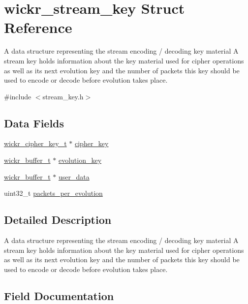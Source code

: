 \hypertarget{structwickr__stream__key}{}\section{wickr\+\_\+stream\+\_\+key Struct Reference}
\label{structwickr__stream__key}


A data structure representing the stream encoding / decoding key material A stream key holds information about the key material used for cipher operations as well as it\textquotesingle{}s next evolution key and the number of packets this key should be used to encode or decode before evolution takes place.  




{\ttfamily \#include $<$stream\+\_\+key.\+h$>$}

\subsection*{Data Fields}
\begin{DoxyCompactItemize}
\item 
\hyperlink{structwickr__cipher__key}{wickr\+\_\+cipher\+\_\+key\+\_\+t} $\ast$ \hyperlink{structwickr__stream__key_a3d957a51193dda882cb89ced2ceeb91e}{cipher\+\_\+key}
\item 
\hyperlink{structwickr__buffer}{wickr\+\_\+buffer\+\_\+t} $\ast$ \hyperlink{structwickr__stream__key_ae7210bd67e61cb4c38733a237dae95d9}{evolution\+\_\+key}
\item 
\hyperlink{structwickr__buffer}{wickr\+\_\+buffer\+\_\+t} $\ast$ \hyperlink{structwickr__stream__key_a51e59da9f7fbb0b3e1332a20252d1cc6}{user\+\_\+data}
\item 
uint32\+\_\+t \hyperlink{structwickr__stream__key_a78777e4c64048b6dae38f8772744194e}{packets\+\_\+per\+\_\+evolution}
\end{DoxyCompactItemize}


\subsection{Detailed Description}
A data structure representing the stream encoding / decoding key material A stream key holds information about the key material used for cipher operations as well as it\textquotesingle{}s next evolution key and the number of packets this key should be used to encode or decode before evolution takes place. 

\subsection{Field Documentation}
\mbox{\label{structwickr__stream__key_a3d957a51193dda882cb89ced2ceeb91e}} 
